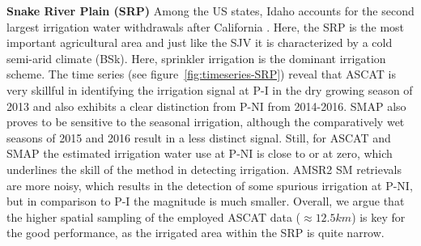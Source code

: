 \documentclass[hess, manuscript]{copernicus}
\begin{document}
\textbf{Snake River Plain (SRP)}
Among the US states, Idaho accounts for the second largest irrigation water withdrawals after California \citep{nass2012census}. Here, the SRP is the most important agricultural area and just like the SJV it is characterized by a cold semi-arid climate (BSk). Here, sprinkler irrigation is the dominant irrigation scheme. The time series (see figure~\ref{fig:timeseries-SRP}) reveal that ASCAT is very skillful in identifying the irrigation signal at P-I in the dry growing season of 2013 and also exhibits a clear distinction from P-NI from 2014-2016. SMAP also proves to be sensitive to the seasonal irrigation, although the comparatively wet seasons of 2015 and 2016 result in a less distinct signal. Still, for ASCAT and SMAP the estimated irrigation water use at P-NI is close to or at zero, which underlines the skill of the method in detecting irrigation. AMSR2 SM retrievals are more noisy, which results in the detection of some spurious irrigation at P-NI, but in comparison to P-I the magnitude is much smaller. Overall, we argue that the higher spatial sampling of the employed ASCAT data ($\approx 12.5 km$) is key for the good performance, as the irrigated area within the SRP is quite narrow.\\
\end{document}

